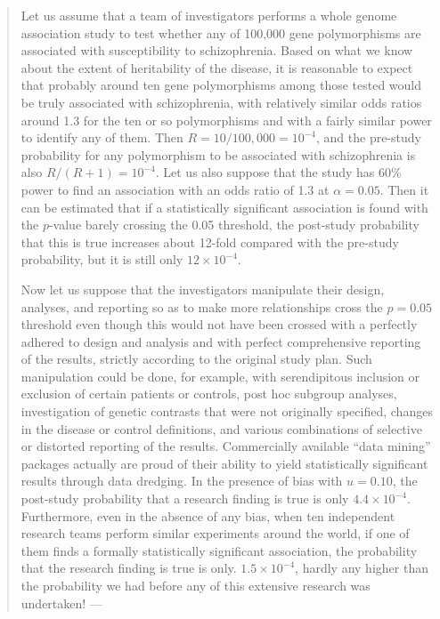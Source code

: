 \documentclass[
  12pt,
]{book}
\begin{document}
\begin{quote}
Let us assume that a team of investigators performs a whole genome association study to test whether any of 100,000 gene polymorphisms are associated with susceptibility to schizophrenia. Based on what we know about the extent of heritability of the disease, it is reasonable to expect that probably around ten gene polymorphisms among those tested would be truly associated with schizophrenia, with relatively similar odds ratios around 1.3 for the ten or so polymorphisms and with a fairly similar power to identify any of them. Then \(R = 10/100,000 = 10^{−4}\), and the pre-study probability for any polymorphism to be associated with schizophrenia is also \(R/(R + 1) = 10^{−4}\). Let us also suppose that the study has 60\% power to find an association with an odds ratio of 1.3 at \(\alpha = 0.05\). Then it can be estimated that if a statistically significant association is found with the \(p\)-value barely crossing the 0.05 threshold, the post-study probability that this is true increases about 12-fold compared with the pre-study probability, but it is still only \(12 × 10^{−4}\).

Now let us suppose that the investigators manipulate their design, analyses, and reporting so as to make more relationships cross the \(p = 0.05\) threshold even though this would not have been crossed with a perfectly adhered to design and analysis and with perfect comprehensive reporting of the results, strictly according to the original study plan. Such manipulation could be done, for example, with serendipitous inclusion or exclusion of certain patients or controls, post hoc subgroup analyses, investigation of genetic contrasts that were not originally specified, changes in the disease or control definitions, and various combinations of selective or distorted reporting of the results. Commercially available ``data mining'' packages actually are proud of their ability to yield statistically significant results through data dredging. In the presence of bias with \(u = 0.10\), the post-study probability that a research finding is true is only \(4.4 × 10^{−4}\). Furthermore, even in the absence of any bias, when ten independent research teams perform similar experiments around the world, if one of them finds a formally statistically significant association, the probability that the research finding is true is only. \(1.5 × 10^{-4}\), hardly any higher than the probability we had before any of this extensive research was undertaken! --- \citep{ioannidis2005most}
\end{quote}
\end{document}
